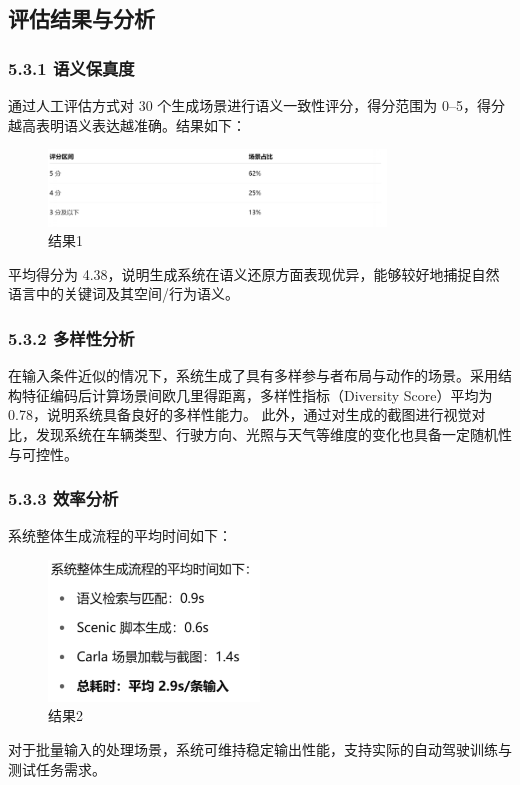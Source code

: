 \subsection{评估结果与分析}
\subsubsection{5.3.1 语义保真度}
通过人工评估方式对 30 个生成场景进行语义一致性评分，得分范围为 0–5，得分越高表明语义表达越准确。结果如下：
\begin{figure}[h]
	\centering
	\includegraphics[width=0.8\textwidth]{"images/picture1.pdf"}
	\caption{结果1}
	\label{fig:example}
\end{figure}
平均得分为 4.38，说明生成系统在语义还原方面表现优异，能够较好地捕捉自然语言中的关键词及其空间/行为语义。

\subsubsection{5.3.2 多样性分析}
在输入条件近似的情况下，系统生成了具有多样参与者布局与动作的场景。采用结构特征编码后计算场景间欧几里得距离，多样性指标（Diversity Score）平均为 0.78，说明系统具备良好的多样性能力。
此外，通过对生成的截图进行视觉对比，发现系统在车辆类型、行驶方向、光照与天气等维度的变化也具备一定随机性与可控性。

\subsubsection{5.3.3 效率分析}
系统整体生成流程的平均时间如下：
\begin{figure}[h]
	\centering
	\includegraphics[width=0.5\textwidth]{"images/picture2.pdf"}
	\caption{结果2}
	\label{fig:example2}
\end{figure}
对于批量输入的处理场景，系统可维持稳定输出性能，支持实际的自动驾驶训练与测试任务需求。

